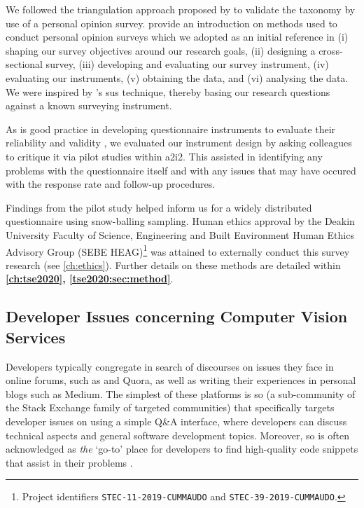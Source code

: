 We followed the triangulation approach proposed by \citet{Jick:1979el} to validate the taxonomy by use of a personal opinion survey. \citet{Kitchenham:2007ux} provide an introduction on methods used to conduct personal opinion surveys which we adopted as an initial reference in (i) shaping our survey objectives around our research goals, (ii) designing a cross-sectional survey, (iii) developing and evaluating our survey instrument, (iv) evaluating our instruments, (v) obtaining the data, and (vi) analysing the data. We were inspired by \citeauthor{Brooke:1996ua}'s \gls{sus} \citep{Brooke:1996ua} technique, thereby basing our research questions against a known surveying instrument.

As is good practice in developing questionnaire instruments to evaluate their reliability and validity \citep{Litwin:1995wt}, we evaluated our instrument design by asking colleagues to critique it via pilot studies within \gls{a2i2}. This assisted in identifying any problems with the questionnaire itself and with any issues that may have occured with the response rate and follow-up procedures.

Findings from the pilot study helped inform us for a widely distributed questionnaire using snow-balling sampling. Human ethics approval by the Deakin University Faculty of Science, Engineering and Built Environment Human Ethics Advisory Group (SEBE HEAG)\footnote{Project identifiers \texttt{STEC-11-2019-CUMMAUDO} and \texttt{STEC-39-2019-CUMMAUDO}.} was attained to externally conduct this survey research (see \cref{ch:ethics}). 
Further details on these methods are detailed within \textbf{\cref{ch:tse2020}, \cref{tse2020:sec:method}}.

\subsection{Developer Issues concerning Computer Vision Services}

Developers typically congregate in search of discourses on issues they face in online forums, such as  and Quora, as well as writing their experiences in personal blogs such as Medium. The simplest of these platforms is \gls{so} (a sub-community of the Stack Exchange family of targeted communities) that specifically targets developer issues on using a simple Q\&A interface, where developers can discuss technical aspects and general software development topics. Moreover, \gls{so} is often acknowledged as \textit{the} `go-to' place for developers to find high-quality code snippets that assist in their problems \citep{Subramanian:2014bg}.

